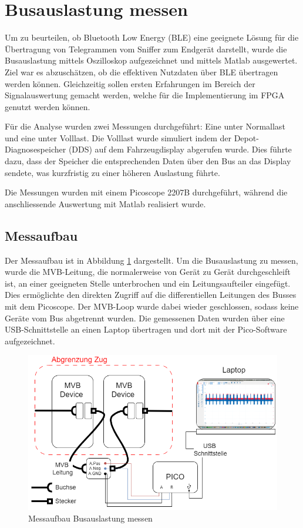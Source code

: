 \section{Busauslastung messen}
Um zu beurteilen, ob Bluetooth Low Energy (BLE) eine geeignete Lösung für die Übertragung von Telegrammen vom Sniffer zum Endgerät darstellt, wurde die Busauslastung mittels Oszilloskop aufgezeichnet und mittels Matlab ausgewertet. Ziel war es abzuschätzen, ob die effektiven Nutzdaten über BLE übertragen werden können. Gleichzeitig sollen ersten Erfahrungen im Bereich der Signalauswertung gemacht werden, welche für die Implementierung im FPGA genutzt werden können.

Für die Analyse wurden zwei Messungen durchgeführt: Eine unter Normallast und eine unter Volllast. Die Volllast wurde simuliert indem der Depot-Diagnosespeicher (DDS) auf dem Fahrzeugdisplay abgerufen wurde. Dies führte dazu, dass der Speicher die entsprechenden Daten über den Bus an das Display sendete, was kurzfristig zu einer höheren Auslastung führte.

Die Messungen wurden mit einem Picoscope 2207B durchgeführt, während die anschliessende Auswertung mit Matlab realisiert wurde.

\subsection{Messaufbau}

Der Messaufbau ist in Abbildung \ref{fig:MessaufbauBusauslastungMessen} dargestellt. Um die Busauslastung zu messen, wurde die MVB-Leitung, die normalerweise von Gerät zu Gerät durchgeschleift ist, an einer geeigneten Stelle unterbrochen und ein Leitungsaufteiler eingefügt. Dies ermöglichte den direkten Zugriff auf die differentiellen Leitungen des Busses mit dem Picoscope. Der MVB-Loop wurde dabei wieder geschlossen, sodass keine Geräte vom Bus abgetrennt wurden. Die gemessenen Daten wurden über eine USB-Schnittstelle an einen Laptop übertragen und dort mit der Pico-Software aufgezeichnet.

\begin{figure}[H]
    \centering
    \includegraphics[width=0.8\linewidth]{Figures/Chap3/Busauslastung/Messaufbau_PICO_IC2000.png}
    \caption{Messaufbau Busauslastung messen}
    \label{fig:MessaufbauBusauslastungMessen}
\end{figure}

